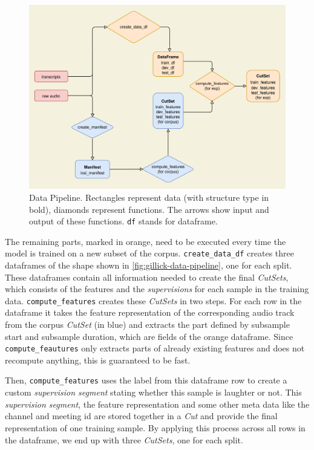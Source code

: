 \documentclass[bsc,frontabs,parskip,deptreport]{infthesis}
\begin{document}
\begin{figure}[h!]
    \centering
    \includegraphics[width=15cm]{imgs/diagrams/Pipeline.drawio.png}
    \caption{Data Pipeline. Rectangles represent data (with structure type in bold), diamonds represent functions. The arrows show input and output of these functions. \texttt{df} stands for dataframe.}
    \label{fig:data-pipeline}
\end{figure}

The remaining parts, marked in orange, need to be executed every time the model is trained on a new subset of the corpus.
\verb|create_data_df| creates three dataframes of the shape shown in \autoref{fig:gillick-data-pipeline}, one for each split.
These dataframes contain all information needed to create the final \textit{CutSets}, which consists of the features and the \textit{supervisions} for each sample in the training data.
\verb|compute_features| creates these \textit{CutSets} in two steps. For each row in the dataframe it takes the feature representation of the corresponding audio track from the corpus \textit{CutSet} (in blue) and extracts the part defined by subsample start and subsample duration, which are fields of the orange dataframe. Since \verb|compute_feautures| only extracts parts of already existing features and does not recompute anything, this is guaranteed to be fast.

Then, \verb|compute_features| uses the label from this dataframe row to create a custom \textit{supervision segment} stating whether this sample is laughter or not. 
This \textit{supervision segment}, the feature representation and some other meta data like the channel and meeting id are stored together in a \textit{Cut} and provide the final representation of one training sample.
By applying this process across all rows in the dataframe, we end up with three \textit{CutSets}, one for each split. 
\end{document}
